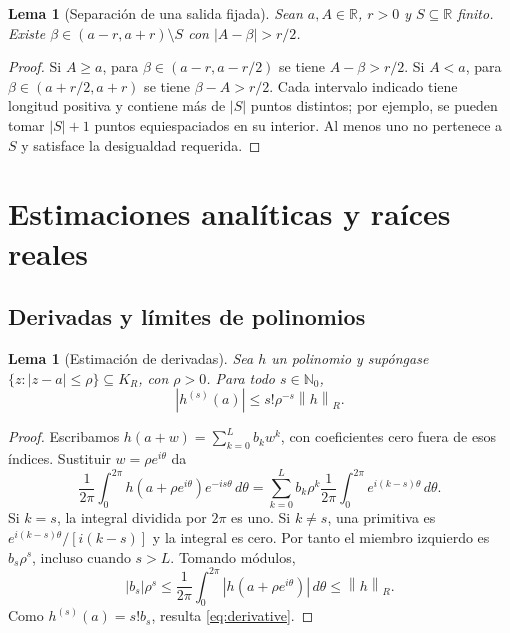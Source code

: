 \documentclass[11pt,a4paper]{article}
\numberwithin{equation}{section}
\newtheorem{lemma}[theorem]{Lema}
\theoremstyle{definition}
\theoremstyle{remark}
\newcommand{\R}{\mathbb R}
\newcommand{\Nn}{\mathbb N_0}
\newcommand{\norm}[1]{\left\lVert#1\right\rVert}
\begin{document}
\begin{lemma}[Separación de una salida fijada]\label{lem:outputsep}
Sean $a,A\in\R$, $r>0$ y $S\subseteq\R$ finito. Existe $\beta\in(a-r,a+r)\setminus S$ con $|A-\beta|>r/2$.
\end{lemma}
\begin{proof}
Si $A\ge a$, para $\beta\in(a-r,a-r/2)$ se tiene $A-\beta>r/2$. Si $A<a$, para $\beta\in(a+r/2,a+r)$ se tiene $\beta-A>r/2$. Cada intervalo indicado tiene longitud positiva y contiene más de $|S|$ puntos distintos; por ejemplo, se pueden tomar $|S|+1$ puntos equiespaciados en su interior. Al menos uno no pertenece a $S$ y satisface la desigualdad requerida.
\end{proof}

\clearpage
\section{Estimaciones analíticas y raíces reales}\label{sec:analytic}

\subsection{Derivadas y límites de polinomios}
\begin{lemma}[Estimación de derivadas]\label{lem:cauchy}
Sea $h$ un polinomio y supóngase $\{z:|z-a|\le\rho\}\subseteq K_R$, con $\rho>0$. Para todo $s\in\Nn$,
\begin{equation}\label{eq:derivative}
|h^{(s)}(a)|\le s!\rho^{-s}\norm h_R.
\end{equation}
\end{lemma}
\begin{proof}
Escribamos $h(a+w)=\sum_{k=0}^L b_kw^k$, con coeficientes cero fuera de esos índices. Sustituir $w=\rho e^{i\theta}$ da
\[
\frac1{2\pi}\int_0^{2\pi}h(a+\rho e^{i\theta})e^{-is\theta}\,d\theta
=\sum_{k=0}^Lb_k\rho^k\frac1{2\pi}\int_0^{2\pi}e^{i(k-s)\theta}\,d\theta.
\]
Si $k=s$, la integral dividida por $2\pi$ es uno. Si $k\ne s$, una primitiva es $e^{i(k-s)\theta}/[i(k-s)]$ y la integral es cero. Por tanto el miembro izquierdo es $b_s\rho^s$, incluso cuando $s>L$. Tomando módulos,
\[
|b_s|\rho^s\le\frac1{2\pi}\int_0^{2\pi}|h(a+\rho e^{i\theta})|\,d\theta\le\norm h_R.
\]
Como $h^{(s)}(a)=s!b_s$, resulta \eqref{eq:derivative}.
\end{proof}
\end{document}
